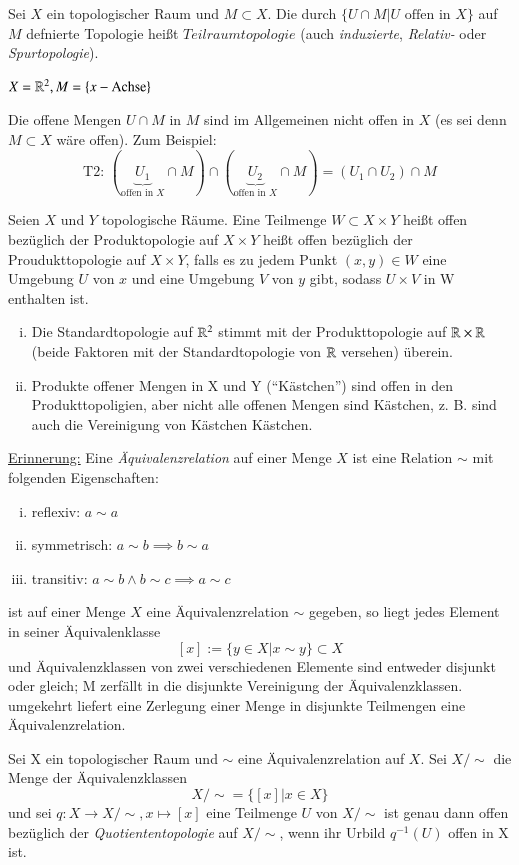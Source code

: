 \documentclass[a4paper,10pt]{scrartcl}
\begin{document}
\begin{df} Sei $ X $ ein topologischer Raum und $ M \subset X $. Die durch $ \{ U\cap M| U \text{ offen in } X \}$ auf $M$ defnierte Topologie heißt $ Teilraumtopologie $ (auch \emph{induzierte}, \emph{Relativ-} oder \emph{Spurtopologie}). 
\end{df}
\begin{ex*}
$X=\mathbb{R}^2, M=\{x-\text{Achse}\}$
\fixme[fig6]
\end{ex*}
\begin{att*}
Die offene Mengen $U\cap M$ in $ M $ sind im Allgemeinen nicht offen in $ X $ (es sei denn $ M\subset X $ wäre offen). Zum Beispiel:
\[
\text{T2: } (\underbrace{U_1}_{\text{offen in }X}\cap M)\cap (\underbrace{U_2}_{\text{offen in }X}\cap M)=(U_1\cap U_2)\cap M
\]
\end{att*}
\begin{df}
Seien $ X $ und $ Y $ topologische Räume. Eine Teilmenge $ W\subset X\times Y $ heißt offen bezüglich der Produktopologie auf $ X\times Y $ heißt offen bezüglich der Proudukttopologie auf $X\times Y$, falls es zu jedem Punkt $ (x,y)\in W $ eine Umgebung $ U $ von $ x $ und eine Umgebung $ V $ von $ y $ gibt, sodass $ U\times V $ in W enthalten ist.
\fixme[fig7]
\end{df}
\begin{note*}
\begin{enumerate}[(i)]
\item Die Standardtopologie auf $ \mathbb{R}^2 $ stimmt mit der Produkttopologie auf $ \mathbb{R}\times \mathbb{R} $ (beide Faktoren mit der Standardtopologie von $ \mathbb{R} $ versehen) überein.
\item Produkte offener Mengen in X und Y ("`Kästchen"') sind offen in den Produkttopoligien, aber nicht alle offenen Mengen sind Kästchen, z. B. sind auch die Vereinigung von Kästchen Kästchen.
\fixme[fig8] 
\end{enumerate}
\underline{Erinnerung:} Eine \emph{Äquivalenzrelation} auf einer Menge $ X $ ist eine Relation $\sim$ mit folgenden Eigenschaften:
\begin{enumerate}[(i)]
\item reflexiv: $a\sim a$
\item symmetrisch: $a\sim b \implies b\sim a$
\item transitiv: $a\sim b \land b \sim c\implies a\sim c$
\end{enumerate}
ist auf einer Menge $ X $ eine Äquivalenzrelation $\sim$ gegeben, so liegt jedes Element in seiner Äquivalenklasse
\[
 [x]:=\{y\in X|x\sim y\} \subset X
\]
und Äquivalenzklassen von zwei verschiedenen Elemente sind entweder disjunkt oder gleich; M zerfällt in die disjunkte Vereinigung der Äquivalenzklassen.  umgekehrt liefert eine Zerlegung einer Menge in disjunkte Teilmengen eine Äquivalenzrelation.
\end{note*}
\begin{df}
Sei X ein topologischer Raum und $\sim$ eine Äquivalenzrelation auf $ X $.  Sei $X/\sim$ die Menge der Äquivalenzklassen 
\[
X/\sim=\{[x]|x\in X\}
\]
und sei $ q: X\to X/\sim, x\mapsto [x] $ eine Teilmenge $ U $ von $ X/\sim $ ist genau dann offen bezüglich der \emph{Quotiententopologie} auf $ X/\sim $, wenn ihr Urbild $ q^{-1}(U) $ offen in X ist.
\end{df}
\end{document}
